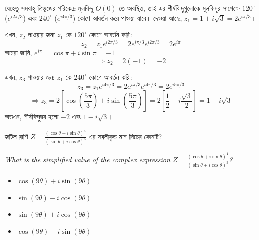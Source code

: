 \documentclass[12pt, a4paper]{article}
\begin{document}
\begin{tcolorbox}[solutionbox={সমাধান (Solution)}]
    \noindent
    যেহেতু সমবাহু ত্রিভুজের পরিকেন্দ্র মূলবিন্দু $O(0)$ তে অবস্থিত, তাই এর শীর্ষবিন্দুগুলোকে মূলবিন্দুর সাপেক্ষে $120^\circ$ ($e^{i 2\pi/3}$) এবং $240^\circ$ ($e^{i 4\pi/3}$) কোণে আবর্তন করে পাওয়া যাবে। দেওয়া আছে, $z_1 = 1 + i\sqrt{3} = 2 e^{i \pi/3}$। 
    
    \vspace{0.5em}
    এখন, $z_2$ পাওয়ার জন্য $z_1$ কে $120^\circ$ কোণে আবর্তন করি:
    \[ z_2 = z_1 e^{i 2\pi/3} = 2 e^{i \pi/3} e^{i 2\pi/3} = 2 e^{i\pi} \]
    আমরা জানি, $e^{i\pi} = \cos\pi + i\sin\pi = -1$। 
    \[ \Rightarrow z_2 = 2(-1) = -2 \]
    
    \vspace{0.5em}
    এখন, $z_3$ পাওয়ার জন্য $z_1$ কে $240^\circ$ কোণে আবর্তন করি:
    \[ z_3 = z_1 e^{i 4\pi/3} = 2 e^{i \pi/3} e^{i 4\pi/3} = 2 e^{i 5\pi/3} \]
    \[ \Rightarrow z_3 = 2\left[\cos\left(\frac{5\pi}{3}\right) + i\sin\left(\frac{5\pi}{3}\right)\right] = 2\left[\frac{1}{2} - i\frac{\sqrt{3}}{2}\right] = 1 - i\sqrt{3} \]
    অতএব, শীর্ষবিন্দুদ্বয় হলো $-2$ এবং $1 - i\sqrt{3}$।
\end{tcolorbox}
\begin{tcolorbox}[questionbox={প্রশ্ন (Question) 17}]
    \noindent
    জটিল রাশি $Z = \frac{(\cos\theta + i\sin\theta)^4}{(\sin\theta + i\cos\theta)^5}$ এর সরলীকৃত মান নিচের কোনটি?
    
    \vspace{0.8em}
    \begin{english}
    \noindent\textit{\color{darkgray}
    What is the simplified value of the complex expression $Z = \frac{(\cos\theta + i\sin\theta)^4}{(\sin\theta + i\cos\theta)^5}$?
    }
    \end{english}
\end{tcolorbox}

\begin{itemize}[label={}, leftmargin=1cm, itemsep=0.5em]
    \item[\textbf{A)}] $\cos(9\theta) + i\sin(9\theta)$
    \item[\textbf{B)}] $\sin(9\theta) - i\cos(9\theta)$
    \item[\textbf{C)}] $\sin(9\theta) + i\cos(9\theta)$
    \item[\textbf{D)}] $\cos(9\theta) - i\sin(9\theta)$
\end{itemize}
\end{document}
